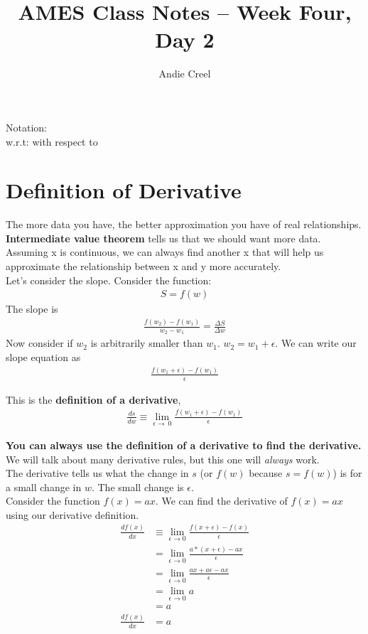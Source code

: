 \documentclass{article}
\title{AMES Class Notes -- Week Four, Day 2}
\author{Andie Creel}
\begin{document}
\maketitle
\raggedright
Notation: \\
w.r.t: with respect to


\section{Definition of Derivative}
The more data you have, the better approximation you have of real relationships.\\

\textbf{Intermediate value theorem} tells us that we should want more data. Assuming x is continuous, we can always find another x that will help us approximate the relationship between x and y more accurately. \\

Let's consider the slope. Consider the function: 
\begin{align}
    S = f(w) 
\end{align}
The slope is 
\begin{align*}
    \frac{f(w_2) - f(w_1)}{w_2-w_1} = \frac{\Delta S}{ \Delta w}
\end{align*}
Now consider if $w_2$ is arbitrarily smaller than $w_1$. $w_2 = w_1 + \epsilon$. We can write our slope equation as 
\begin{align*}
    \frac{f(w_1 + \epsilon) - f(w_1)}{\epsilon}
\end{align*}

This is the \textbf{definition of a derivative}, 
\begin{align*}
    \frac{ds}{dw} \equiv \lim_{\epsilon \to \ 0} \frac{f(w_1 + \epsilon) - f(w_1)}{\epsilon}
\end{align*}

\textbf{You can always use the definition of a derivative to find the derivative.} We will talk about many derivative rules, but this one will \textit{always} work.\\

The derivative tells us what the change in $s$ (or $f(w)$ because $s = f(w)$) is for a small change in $w$. The small change is $\epsilon$. \\

Consider the function $f(x) = ax$. We can find the derivative of $f(x) = ax$ using our derivative definition. \\

\begin{align}
    \frac{df(x)}{dx} &\equiv \lim_{\epsilon \to 0} \frac{f(x+ \epsilon) - f(x)}{\epsilon}\\
    &= \lim_{\epsilon \to 0} \frac{a*(x + \epsilon) - ax}{\epsilon}\\
    &= \lim_{\epsilon \to 0} \frac{ax + a\epsilon - ax}{\epsilon}\\
    &= \lim_{\epsilon \to 0} a\\
    &= a \\
    \frac{df(x)}{dx} &= a
\end{align}
\end{document}

